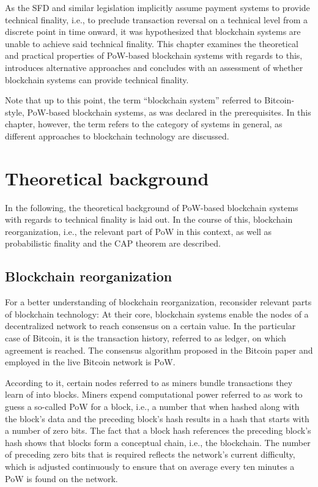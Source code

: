 As the SFD and similar legislation implicitly assume payment systems to provide technical finality, i.e., to preclude transaction reversal on a technical level from a discrete point in time onward, it was hypothesized that blockchain systems are unable to achieve said technical finality.
This chapter examines the theoretical and practical properties of PoW-based blockchain systems with regards to this, introduces alternative approaches and concludes with an assessment of whether blockchain systems can provide technical finality.

Note that up to this point, the term ``blockchain system'' referred to Bitcoin-style, PoW-based blockchain systems, as was declared in the prerequisites.
In this chapter, however, the term refers to the category of systems in general, as different approaches to blockchain technology are discussed.

\section{Theoretical background}

In the following, the theoretical background of PoW-based blockchain systems with regards to technical finality is laid out.
In the course of this, blockchain reorganization, i.e., the relevant part of PoW in this context, as well as probabilistic finality and the CAP theorem are described.

\subsection{Blockchain reorganization}

For a better understanding of blockchain reorganization, reconsider relevant parts of blockchain technology:
At their core, blockchain systems enable the nodes of a decentralized network to reach consensus on a certain value.
In the particular case of Bitcoin, it is the transaction history, referred to as ledger, on which agreement is reached.
The consensus algorithm proposed in the Bitcoin paper and employed in the live Bitcoin network is PoW.

According to it, certain nodes referred to as miners bundle transactions they learn of into blocks.
Miners expend computational power referred to as work to guess a so-called PoW for a block, i.e., a number that when hashed along with the block's data and the preceding block's hash results in a hash that starts with a number of zero bits.
The fact that a block hash references the preceding block's hash shows that blocks form a conceptual chain, i.e., the blockchain.
The number of preceding zero bits that is required reflects the network's current difficulty, which is adjusted continuously to ensure that on average every ten minutes a PoW is found on the network. 

